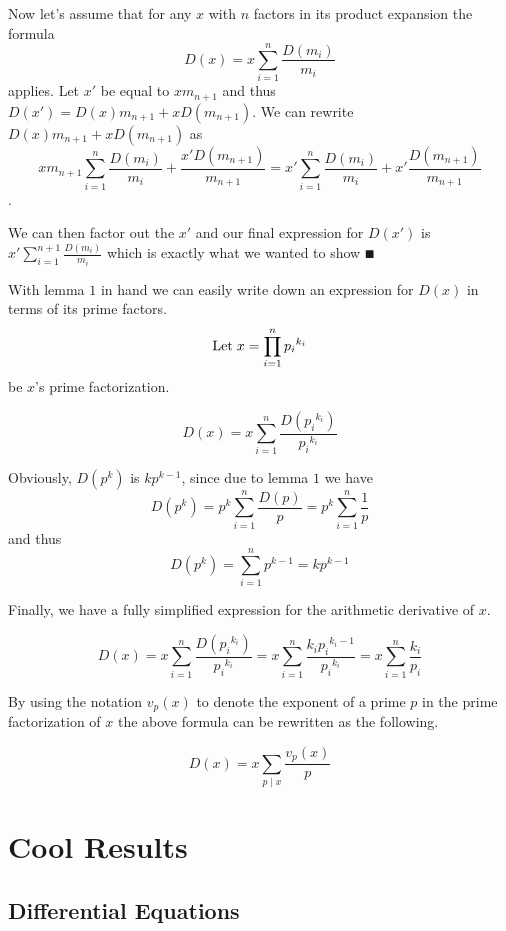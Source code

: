 \documentclass[paper=a4,fontsize=paper,12.5pt]{book}
\newcommand{\3}{\vspace*{3mm}}
\begin{document}
\3

Now let's assume that for any $x$ with $n$ factors in its product expansion the formula \[D(x) = x\sum_{i = 1}^n \frac{D(m_i)}{m_i}\]  applies. Let $x'$ be equal to $xm_{n+1}$ and thus $D(x') = D(x)m_{n+1} +xD(m_{n+1})$. We can rewrite $D(x)m_{n+1} +xD(m_{n+1})$ as \[xm_{n+1} \sum_{i = 1}^n \frac{D(m_i)}{m_i}+ \frac{x'D(m_{n+1})}{m_{n+1}} = x' \sum_{i = 1}^n \frac{D(m_i)}{m_i} +x'\frac{D(m_{n+1})}{m_{n+1}} \].

\3

We can then factor out the $x'$ and our final expression for $D(x')$ is $x'\sum_{i = 1}^{n+1} \frac{D(m_i)}{m_i}$ which is exactly what we wanted to show $\QED$

\3

With lemma $1$ in hand we can easily write down an expression for $D(x)$ in terms of its prime factors.\[\text{Let} \hspace*{1mm} x = \prod_{i =1}^n{p_i}^{k_i}\] be $x$'s prime factorization.

\[ D(x) = x\sum_{i = 1}^{n} \frac{D({p_i}^{k_i})}{{p_i}^{k_i}} \]

 \3
 
Obviously, $D(p^k)$ is $kp^{k-1}$, since due to lemma $1$ we have \[D(p^k) = p^k\sum_{i = 1}^n \frac{D(p)}{p} =p^k\sum_{i = 1}^n \frac{1}{p} \] and thus \[D(p^k)  = \sum_{i = 1}^n p^{k-1} = k p^{k-1} \]

\3

Finally, we have a fully simplified expression for the arithmetic derivative of $x$.

\[D(x) = x\sum_{i = 1}^{n} \frac{D({p_i}^{k_i})}{{p_i}^{k_i}} = x\sum_{i = 1}^{n} \frac{{k_i}{p_i}^{k_i -1}}{{p_i}^{k_i}} = x\sum_{i = 1}^{n} \frac{k_i}{p_i}\] 

\3

By using the notation $v_p(x)$ to denote the exponent of a prime $p$ in the prime factorization of $x$ the above formula can be rewritten as the following.

\begin{theorem}

\[D(x) = x\sum_{p \mid x} \frac{v_p(x)}{p}\]

\end{theorem}

\section*{Cool Results}

\subsection*{Differential Equations} 
\end{document}
